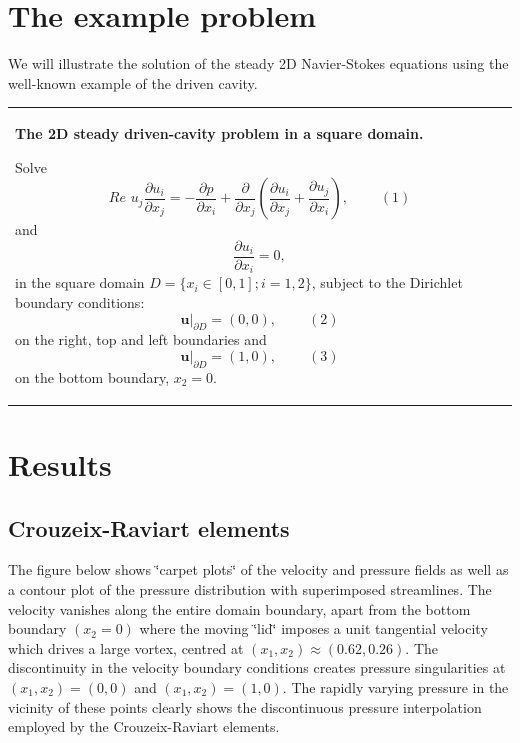  

\hypertarget{index_example}{}\section{The example problem}\label{index_example}
We will illustrate the solution of the steady 2D Navier-\/\+Stokes equations using the well-\/known example of the driven cavity.

\begin{center} \tabulinesep=1mm
\begin{longtabu} spread 0pt [c]{*{1}{|X[-1]}|}
\hline
\begin{center} {\bfseries The 2D steady driven-\/cavity problem in a square domain.} \end{center}  Solve \[ Re\phantom{i}u_j\frac{\partial u_i}{\partial x_j} = - \frac{\partial p}{\partial x_i} + \frac{\partial }{\partial x_j} \left( \frac{\partial u_i}{\partial x_j} + \frac{\partial u_j}{\partial x_i} \right), \ \ \ \ \ \ \ \ \ \ (1) \] and \[ \frac{\partial u_i}{\partial x_i} = 0, \] in the square domain $ D = \{x_i \in [0,1]; i=1,2 \} $, subject to the Dirichlet boundary conditions\+: \[ \left. \mathbf{u}\right|_{\partial D}=(0,0), \ \ \ \ \ \ \ \ \ \ (2) \] on the right, top and left boundaries and \[ \left. \mathbf{u}\right|_{\partial D}=(1,0), \ \ \ \ \ \ \ \ \ \ (3) \] on the bottom boundary, $ x_2=0.$   \\
\end{longtabu}
\end{center} 



 

\hypertarget{index_results}{}\section{Results}\label{index_results}
\hypertarget{index_results_CR}{}\subsection{Crouzeix-\/\+Raviart elements}\label{index_results_CR}
The figure below shows \char`\"{}carpet plots\char`\"{} of the velocity and pressure fields as well as a contour plot of the pressure distribution with superimposed streamlines. The velocity vanishes along the entire domain boundary, apart from the bottom boundary $ (x_2=0) $ where the moving \char`\"{}lid\char`\"{} imposes a unit tangential velocity which drives a large vortex, centred at $ (x_1,x_2) \approx (0.62,0.26)$. The discontinuity in the velocity boundary conditions creates pressure singularities at $ (x_1,x_2) = (0,0)$ and $ (x_1,x_2) = (1,0)$. The rapidly varying pressure in the vicinity of these points clearly shows the discontinuous pressure interpolation employed by the Crouzeix-\/\+Raviart elements.


